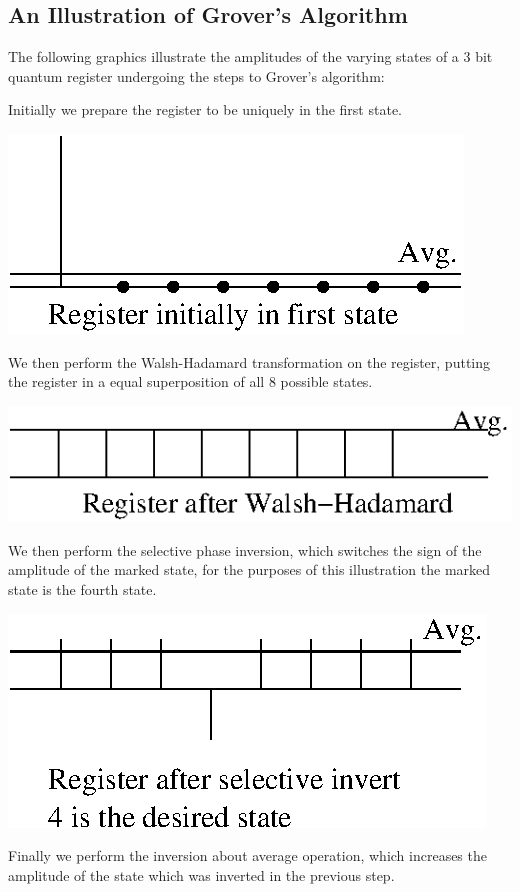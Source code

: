 \documentclass[]{article}
\begin{document}
\subsection{An Illustration of Grover's Algorithm}

The following graphics illustrate the amplitudes of the varying states
of a 3 bit quantum register undergoing the steps to Grover's
algorithm:

Initially we prepare the register to be uniquely in the first state.

\includegraphics{init.eps}

We then perform the Walsh-Hadamard transformation on the register,
putting the register in a equal superposition of all 8 possible
states.

\includegraphics{wh.eps}

We then perform the selective phase inversion, which switches the sign
of the amplitude of the marked state, for the purposes of this
illustration the marked state is the fourth state.

\includegraphics{invert.eps}
	
Finally we perform the inversion about average operation, which
increases the amplitude of the state which was inverted in the
previous step.
\end{document}
